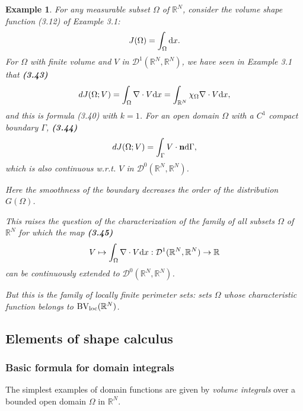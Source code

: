 \documentclass[oneside]{book}
\numberwithin{equation}{section}
\newtheorem{example}{Example}[section]
\begin{document}
\begin{example}
    For any measurable subset $\Omega$ of $\mathbb{R}^N$, consider the volume shape function (3.12) of Example 3.1:
    \begin{align*}
        J(\Omega) = \int_\Omega {\rm d}x.
    \end{align*}
    For $\Omega$ with finite volume and $V$ in $\mathcal{D}^1(\mathbb{R}^N,\mathbb{R}^N)$, we have seen in Example 3.1 that \textbf{(3.43)}
    \begin{align*}
        dJ(\Omega;V) = \int_\Omega \nabla\cdot V{\rm d}x = \int_{\mathbb{R}^N} \chi_\Omega\nabla\cdot V{\rm d}x,
    \end{align*}
    and this is formula (3.40) with $k = 1$. For an open domain $\Omega$ with a $C^1$ compact boundary $\Gamma$, \textbf{(3.44)}
    \begin{align*}
        dJ(\Omega;V) = \int_\Gamma V\cdot{\bf n}{\rm d}\Gamma,
    \end{align*}
    which is also continuous w.r.t. $V$ in $\mathcal{D}^0(\mathbb{R}^N,\mathbb{R}^N)$.
    
    Here the smoothness of the boundary decreases the order of the distribution $G(\Omega)$.
    
    This raises the question of the characterization of the family of all subsets $\Omega$ of $\mathbb{R}^N$ for which the map \textbf{(3.45)}
    \begin{align*}
        V\mapsto\int_\Omega \nabla\cdot V{\rm d}x:\mathcal{D}^1(\mathbb{R}^N,\mathbb{R}^N)\to\mathbb{R}
    \end{align*}
    can be continuously extended to $\mathcal{D}^0(\mathbb{R}^N,\mathbb{R}^N)$.
    
    But this is the family of \emph{locally finite perimeter sets}: sets $\Omega$ whose characteristic function belongs to $\operatorname{BV}_{\rm loc}(\mathbb{R}^N)$.
\end{example}

\subsection{Elements of shape calculus}

\subsubsection{Basic formula for domain integrals}
The simplest examples of domain functions are given by \textit{volume integrals} over a bounded open domain $\Omega$ in $\mathbb{R}^N$.
\end{document}
